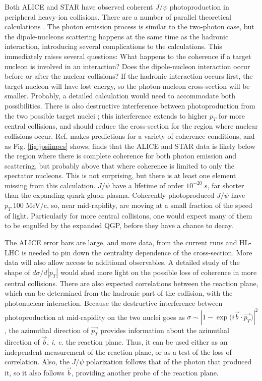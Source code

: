 \documentclass[../report.tex]{subfiles}
\begin{document}
Both ALICE \cite{Adam:2015gba}  and STAR \cite{Zha:2018ohg} have observed coherent $J/\psi$ photoproduction in peripheral heavy-ion collisions.  There are a number of parallel theoretical calculations \cite{Klusek-Gawenda:2015hja,Zha:2017jch}.  The photon emission process is similar to the two-photon case, but the dipole-nucleons scattering happens at the same time as the hadronic interaction, introducing several complications to the calculations.  This immediately raises several questions:  What happens to the coherence if a target nucleon is involved in an interaction?   Does the dipole-nucleon interaction occur before or after the nuclear collisions?    If the hadronic interaction occurs first, the target nucleon will have lost energy, so the photon-nucleon cross-section will be smaller.  Probably, a detailed calculation would need to accommodate both possibilities.   There is also destructive interference between photoproduction from the two possible target nuclei \cite{Abelev:2008ew}; this interference extends to higher $p_T$ for more central collisions, and should reduce the cross-section for the region where nuclear collisions occur.  Ref. \cite{Zha:2017jch} makes predictions for a variety of coherence conditions, and as Fig. \ref{fig:jpsiinpcs} shows, finds that the ALICE and STAR data is likely below the region where there is complete coherence for both photon emission and scattering, but probably above that where coherence is limited to only the spectator nucleons.  This is not surprising, but there is at least one element missing from this calculation.  $J/\psi$ have a lifetime of order $10^{-20}$ s, far shorter than the expanding quark gluon plasma.  Coherently photoproduced $J/\psi$ have $p_T ~ 100$ MeV/c, so, near mid-rapidity,  are moving at a small fraction of the speed of light.  Particularly for more central collisions, one would expect many of them to be engulfed by the expanded QGP, before they have a chance to decay.  

The ALICE error bars are large, and more data, from the current runs and HL-LHC is needed to pin down the centrality dependence of the cross-section.  More data will also allow access to additional observables.  A detailed study of the shape of $d\sigma/d|p_T|$ would shed more light on the possible loss of coherence in more central collisions. There are also expected correlations between the reaction plane, which can be determined from the hadronic part of the collision, with the photonuclear interaction.  Because the destructive interference between photoproduction at mid-rapidity on the two nuclei goes as $\sigma \sim |1-\exp{(i{\vec{b}\cdot\vec{p_T})}}|^2$ \cite{Klein:1999gv}, the azimuthal direction of $\vec{p_T}$ provides information about the azimuthal direction of $\vec{b}$, {\it i. e.} the reaction plane.  Thus, it can be used either as an independent measurement of the reaction plane, or as a test of the loss of correlation.  Also, the $J/\psi$ polarization follows that of the photon that produced it, so it also follows $\vec{b}$, providing another probe of the reaction plane.
\end{document}
